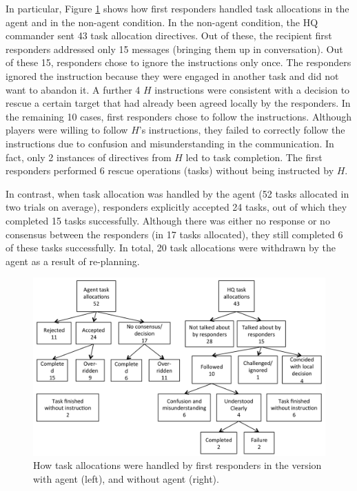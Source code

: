 In particular, Figure \ref{fig:msgs} shows how first responders handled task allocations in the agent and in the non-agent condition. In the non-agent condition, the HQ commander sent 43 task allocation directives. Out of these, the recipient first responders addressed only 15 messages (bringing them up in conversation). Out of these 15, responders chose to ignore the instructions only once. The responders ignored the instruction because they were engaged in another task and did not want to abandon it. A further 4 $H$ instructions were consistent with a decision to rescue a certain target that had already been agreed locally by the responders. In the remaining 10 cases, first responders chose to follow the instructions. Although players were willing to follow $H$'s instructions, they failed to correctly follow the instructions due to confusion and misunderstanding in the communication. In fact, only 2 instances of directives from $H$ led to task completion. The first responders performed 6 rescue operations (tasks) without being instructed by $H$.

In contrast, when task allocation was handled by the agent (52 tasks allocated in two trials on average), responders explicitly accepted 24 tasks, out of which they completed 15 tasks successfully. Although there was either no response or no consensus between the responders (in 17 tasks allocated), they still completed 6 of these tasks successfully. In total, 20 task allocations were withdrawn by the agent as a result of re-planning. 

\begin{figure}[htbp]
\includegraphics[width=\columnwidth]{message_handling.png}
\vspace{-3mm}
\caption{How task allocations were handled by first responders in the version with agent (left), and without agent (right).\vspace{-3mm}}\label{fig:msgs}
\end{figure}


